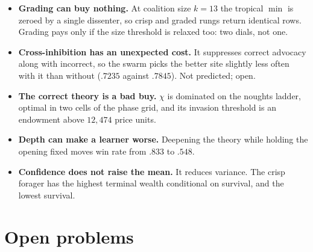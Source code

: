\begin{itemize}[leftmargin=1.4em]
\item \textbf{Grading can buy nothing.} At coalition size $k=13$ the tropical
$\min$ is zeroed by a single dissenter, so crisp and graded rungs return identical
rows. Grading pays only if the size threshold is relaxed too: two dials, not one.
\item \textbf{Cross-inhibition has an unexpected cost.} It suppresses correct
advocacy along with incorrect, so the swarm picks the better site slightly less
often with it than without ($.7235$ against $.7845$). Not predicted; open.
\item \textbf{The correct theory is a bad buy.} $\chi$ is dominated on the
noughts ladder, optimal in two cells of the phase grid, and its invasion threshold
is an endowment above $12{,}474$ price units.
\item \textbf{Depth can make a learner worse.} Deepening the theory while holding
the opening fixed moves win rate from $.833$ to $.548$.
\item \textbf{Confidence does not raise the mean.} It reduces variance. The crisp
forager has the highest terminal wealth conditional on survival, and the lowest
survival.
\end{itemize}

\section{Open problems}
\label{sec:open}


